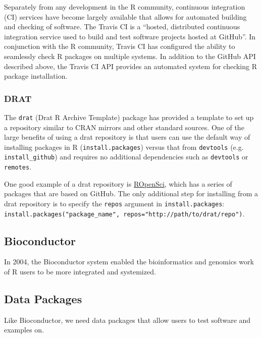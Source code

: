 \documentclass[]{elsarticle} %
\begin{document}
Separately from any development in the R community, continuous
integration (CI) services have become largely available that allows for
automated building and checking of software. The Travis CI is a
``hosted, distributed continuous integration service used to build and
test software projects hosted at GitHub''. In conjunction with the R
community, Travis CI has configured the ability to seamlessly check R
packages on multiple systems. In addition to the GitHub API described
above, the Travis CI API provides an automated system for checking R
package installation.

\subsubsection{DRAT}\label{drat}

The \texttt{drat} (Drat R Archive Template) package has provided a
template to set up a repository similar to CRAN mirrors and other
standard sources. One of the large benefits of using a drat repository
is that users can use the default way of installing packages in R
(\texttt{install.packages}) versus that from \texttt{devtools} (e.g.
\texttt{install\_github}) and requires no additional dependencies such
as \texttt{devtools} or \texttt{remotes}.

One good example of a drat repository is
\href{https://ropensci.org/}{ROpenSci}, which has a series of packages
that are based on GitHub. The only additional step for installing from a
drat repository is to specify the \texttt{repos} argument in
\texttt{install.packages}:
\texttt{install.packages("package\_name",\ repos="http://path/to/drat/repo")}.

\subsection{Bioconductor}

In 2004, the Bioconductor system enabled the bioinformatics and genomics
work of R users to be more integrated and systemized\citep{bioc1,bioc2}.

\subsection{Data Packages}\label{data-packages}

Like Bioconductor, we need data packages that allow users to test
software and examples on.



\end{document}
